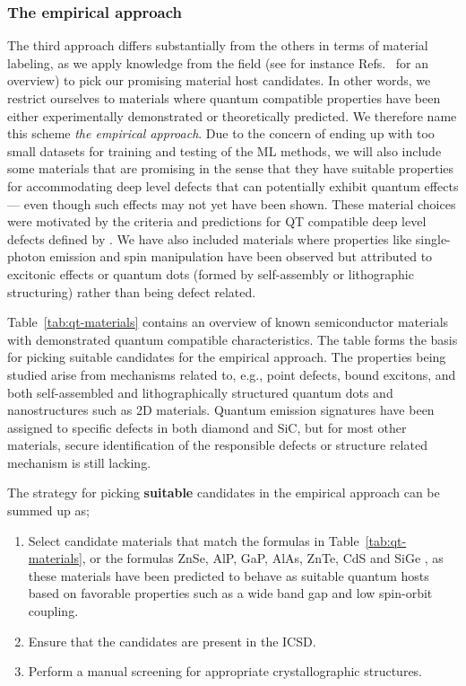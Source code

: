 \documentclass[superscriptaddress,unsortedaddress,
 amsmath,amssymb,
 aps,
]{revtex4-2}
\begin{document}
\subsubsection*{The empirical approach}
The third approach differs substantially from the others in terms of material labeling, as we apply knowledge from the field (see for instance Refs.~\cite{Atatuere2018,Toth2019,Zhang2020,Son2020} for an overview) to pick our promising material host candidates.  
In other words, we restrict ourselves to materials where quantum compatible properties have been either experimentally demonstrated or theoretically predicted. 
We therefore name this scheme \emph{the empirical approach}. Due to the concern of ending up with too small datasets for training and testing of the ML methods, we will also include some  materials that are promising in the sense that they have suitable properties for accommodating deep level defects that can potentially exhibit quantum effects --- even though such effects may not yet have been shown. These material choices were motivated by the criteria and predictions for QT compatible deep level defects defined by \citeauthor{Weber2010} \cite{Weber2010}. 
We have also included materials where properties like single-photon emission and spin manipulation have been observed but attributed to excitonic effects or quantum dots (formed by self-assembly or lithographic structuring) rather than being defect related.


Table~\ref{tab:qt-materials} contains an overview of known semiconductor materials with demonstrated quantum compatible characteristics. The table forms the basis for picking suitable candidates for the empirical approach. The properties being studied arise from mechanisms related to, e.g., point defects, bound excitons, and both self-assembled and lithographically structured quantum dots and nanostructures such as 2D materials. 
Quantum emission signatures have been assigned to specific defects in both diamond and SiC, but for most other materials, secure identification of the responsible defects or structure related mechanism is still lacking.  

The strategy for picking \textbf{suitable} candidates in the empirical approach can be summed up as;  
\begin{enumerate}
    \item Select candidate materials that match the formulas in  Table~\ref{tab:qt-materials}, or the formulas ZnSe, AlP, GaP, AlAs, ZnTe, CdS \cite{Weber2010} and SiGe \cite{Hardy2019}, as these materials have been predicted to behave as suitable quantum hosts based on favorable properties such as a wide band gap and low spin-orbit coupling.  
    \item Ensure that the candidates are present in the ICSD.  
    \item Perform a manual screening for appropriate crystallographic structures. 
\end{enumerate}
\end{document}

